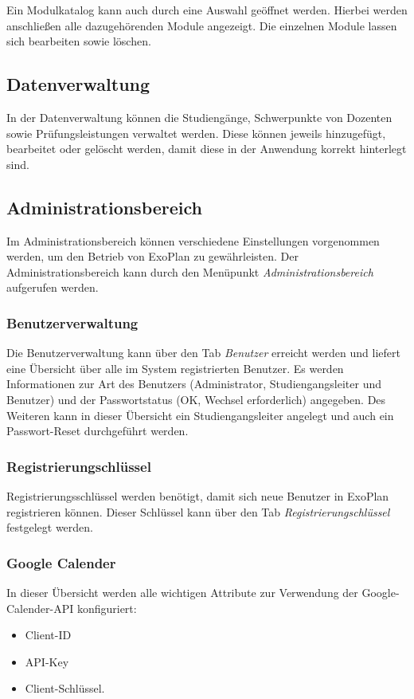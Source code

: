 Ein Modulkatalog kann auch durch eine Auswahl geöffnet werden. 
Hierbei werden anschließen alle dazugehörenden Module angezeigt. 
Die einzelnen Module lassen sich bearbeiten sowie löschen.

\subsection{Datenverwaltung}

In der Datenverwaltung können die Studiengänge, Schwerpunkte von Dozenten sowie Prüfungsleistungen verwaltet werden.
Diese können jeweils hinzugefügt, bearbeitet oder gelöscht werden, damit diese in der Anwendung korrekt hinterlegt sind.

\subsection{Administrationsbereich}

Im Administrationsbereich können verschiedene Einstellungen vorgenommen werden, um den Betrieb von ExoPlan zu gewährleisten. 
Der Administrationsbereich kann durch den Menüpunkt \textit{Administrationsbereich} aufgerufen werden.

\subsubsection{Benutzerverwaltung}

Die Benutzerverwaltung kann über den Tab \textit{Benutzer} erreicht werden und liefert eine Übersicht über alle im System registrierten Benutzer. 
Es werden Informationen zur Art des Benutzers (Administrator, Studiengangsleiter und Benutzer) und der Passwortstatus (OK, Wechsel erforderlich) angegeben. 
Des Weiteren kann in dieser Übersicht ein Studiengangsleiter angelegt und auch ein Passwort-Reset durchgeführt werden.

\subsubsection{Registrierungschlüssel}

Registrierungsschlüssel werden benötigt, damit sich neue Benutzer in ExoPlan registrieren können. 
Dieser Schlüssel kann über den Tab \textit{Registrierungschlüssel} festgelegt werden.

\subsubsection{Google Calender}

In dieser Übersicht werden alle wichtigen Attribute zur Verwendung der Google-Calender-API konfiguriert:
\begin{itemize}
	\item Client-ID
	\item API-Key
	\item Client-Schlüssel.
\end{itemize}
